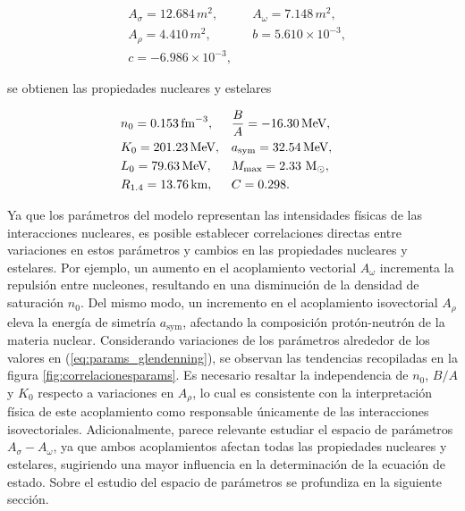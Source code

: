 \begin{equation}
\begin{aligned}
&A_\sigma = 12.684 \, m^2, &
&A_\omega = 7.148 \, m^2, \\
&A_\rho = 4.410 \, m^2, &
&b = 5.610\times10^{-3}, \\
&c = -6.986\times10^{-3}, & &
\label{eq:params_glendenning}
\end{aligned}
\end{equation}
	
se obtienen las propiedades nucleares y estelares

\begin{equation}
\begin{aligned}
&n_0 = 0.153 \, \text{fm}^{-3}, &
&\frac{B}{A} = -16.30 \, \text{MeV}, \\
&K_0 = 201.23 \, \text{MeV}, &
&a_\text{sym} = 32.54 \, \text{MeV}, \\
&L_0 = 79.63 \, \text{MeV}, & 
&M_\text{max} = 2.33 \, \,\text{M}_\odot, \\
&R_{1.4} = 13.76 \, \text{km}, &
&C = 0.298. &
\label{eq:props_glendenning}
\end{aligned}
\end{equation}

Ya que los parámetros del modelo representan las intensidades físicas de las interacciones nucleares, es posible establecer correlaciones directas entre variaciones en estos parámetros y cambios en las propiedades nucleares y estelares. Por ejemplo, un aumento en el acoplamiento vectorial $A_\omega$ incrementa la repulsión entre nucleones, resultando en una disminución de la densidad de saturación $n_0$. Del mismo modo, un incremento en el acoplamiento isovectorial $A_\rho$ eleva la energía de simetría $a_\text{sym}$, afectando la composición protón-neutrón de la materia nuclear. Considerando variaciones de los parámetros alrededor de los valores en (\ref{eq:params_glendenning}), se observan las tendencias recopiladas en la figura \ref{fig:correlacionesparams}. Es necesario resaltar la independencia de $n_0$, $B/A$ y $K_0$ respecto a variaciones en $A_\rho$, lo cual es consistente con la interpretación física de este acoplamiento como responsable únicamente de las interacciones isovectoriales. Adicionalmente, parece relevante estudiar el espacio de parámetros $A_\sigma - A_\omega$, ya que ambos acoplamientos afectan todas las propiedades nucleares y estelares, sugiriendo una mayor influencia en la determinación de la ecuación de estado. Sobre el estudio del espacio de parámetros se profundiza en la siguiente sección.

